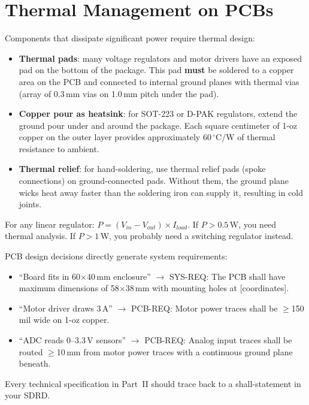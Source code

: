 \documentclass[11pt,letterpaper,twoside,openany]{book}
\begin{document}
\section{Thermal Management on PCBs}
Components that dissipate significant power require thermal design:
\begin{itemize}[leftmargin=1.5em]
\item \textbf{Thermal pads}: many voltage regulators and motor drivers have an exposed pad on the bottom of the package. This pad \textbf{must} be soldered to a copper area on the PCB and connected to internal ground planes with thermal vias (array of 0.3\,mm vias on 1.0\,mm pitch under the pad).
\item \textbf{Copper pour as heatsink}: for SOT-223 or D-PAK regulators, extend the ground pour under and around the package. Each square centimeter of 1-oz copper on the outer layer provides approximately $60\,^{\circ}$C/W of thermal resistance to ambient.
\item \textbf{Thermal relief}: for hand-soldering, use thermal relief pads (spoke connections) on ground-connected pads. Without them, the ground plane wicks heat away faster than the soldering iron can supply it, resulting in cold joints.
\end{itemize}

\begin{tipbox}
For any linear regulator: $P = (V_{in} - V_{out}) \times I_{load}$. If $P > 0.5$\,W, you need thermal analysis. If $P > 1$\,W, you probably need a switching regulator instead.
\end{tipbox}

\begin{keyconceptbox}
PCB design decisions directly generate system requirements:
\begin{itemize}[nosep,leftmargin=1.5em]
\item ``Board fits in 60$\times$40\,mm enclosure'' $\to$ SYS-REQ: The PCB shall have maximum dimensions of 58$\times$38\,mm with mounting holes at [coordinates].
\item ``Motor driver draws 3\,A'' $\to$ PCB-REQ: Motor power traces shall be $\geq$150\,mil wide on 1-oz copper.
\item ``ADC reads 0--3.3\,V sensors'' $\to$ PCB-REQ: Analog input traces shall be routed $\geq$10\,mm from motor power traces with a continuous ground plane beneath.
\end{itemize}
Every technical specification in Part~II should trace back to a shall-statement in your SDRD.
\end{keyconceptbox}
\end{document}
